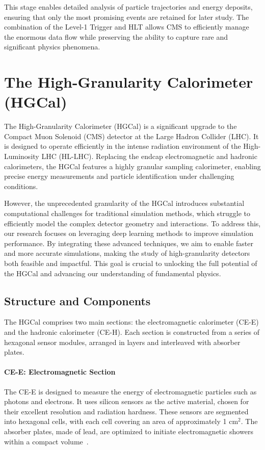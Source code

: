 This stage enables detailed analysis of particle trajectories and energy deposits, ensuring that only the most promising events are retained for later study. The combination of the Level-1 Trigger and HLT allows CMS to efficiently manage the enormous data flow while preserving the ability to capture rare and significant physics phenomena.

\section{The High-Granularity Calorimeter (HGCal)}

The High-Granularity Calorimeter (HGCal) is a significant upgrade to the Compact Muon Solenoid (CMS) detector at the Large Hadron Collider (LHC). It is designed to operate efficiently in the intense radiation environment of the High-Luminosity LHC (HL-LHC). Replacing the endcap electromagnetic and hadronic calorimeters, the HGCal features a highly granular sampling calorimeter, enabling precise energy measurements and particle identification under challenging conditions.

However, the unprecedented granularity of the HGCal introduces substantial computational challenges for traditional simulation methods, which struggle to efficiently model the complex detector geometry and interactions. To address this, our research focuses on leveraging deep learning methods to improve simulation performance. By integrating these advanced techniques, we aim to enable faster and more accurate simulations, making the study of high-granularity detectors both feasible and impactful. This goal is crucial to unlocking the full potential of the HGCal and advancing our understanding of fundamental physics.

\subsection{Structure and Components}

The HGCal comprises two main sections: the electromagnetic calorimeter (CE-E) and the hadronic calorimeter (CE-H). Each section is constructed from a series of hexagonal sensor modules, arranged in layers and interleaved with absorber plates.

\paragraph{CE-E: Electromagnetic Section}
The CE-E is designed to measure the energy of electromagnetic particles such as photons and electrons. It uses silicon sensors as the active material, chosen for their excellent resolution and radiation hardness. These sensors are segmented into hexagonal cells, with each cell covering an area of approximately 1 cm$^2$. The absorber plates, made of lead, are optimized to initiate electromagnetic showers within a compact volume~\cite{hgcal_tdr}.

